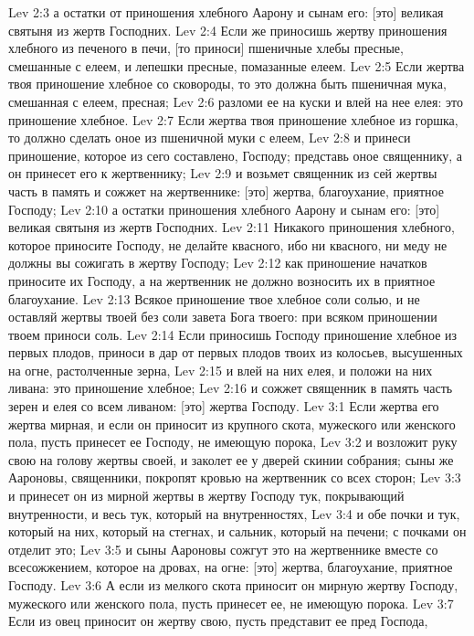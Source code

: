 Lev 2:3  а остатки от приношения хлебного Аарону и сынам его: [это] великая святыня из жертв Господних.
Lev 2:4  Если же приносишь жертву приношения хлебного из печеного в печи, [то приноси] пшеничные хлебы пресные, смешанные с елеем, и лепешки пресные, помазанные елеем.
Lev 2:5  Если жертва твоя приношение хлебное со сковороды, то это должна быть пшеничная мука, смешанная с елеем, пресная;
Lev 2:6  разломи ее на куски и влей на нее елея: это приношение хлебное.
Lev 2:7  Если жертва твоя приношение хлебное из горшка, то должно сделать оное из пшеничной муки с елеем,
Lev 2:8  и принеси приношение, которое из сего составлено, Господу; представь оное священнику, а он принесет его к жертвеннику;
Lev 2:9  и возьмет священник из сей жертвы часть в память и сожжет на жертвеннике: [это] жертва, благоухание, приятное Господу;
Lev 2:10  а остатки приношения хлебного Аарону и сынам его: [это] великая святыня из жертв Господних.
Lev 2:11  Никакого приношения хлебного, которое приносите Господу, не делайте квасного, ибо ни квасного, ни меду не должны вы сожигать в жертву Господу;
Lev 2:12  как приношение начатков приносите их Господу, а на жертвенник не должно возносить их в приятное благоухание.
Lev 2:13  Всякое приношение твое хлебное соли солью, и не оставляй жертвы твоей без соли завета Бога твоего: при всяком приношении твоем приноси соль.
Lev 2:14  Если приносишь Господу приношение хлебное из первых плодов, приноси в дар от первых плодов твоих из колосьев, высушенных на огне, растолченные зерна,
Lev 2:15  и влей на них елея, и положи на них ливана: это приношение хлебное;
Lev 2:16  и сожжет священник в память часть зерен и елея со всем ливаном: [это] жертва Господу.
Lev 3:1  Если жертва его жертва мирная, и если он приносит из крупного скота, мужеского или женского пола, пусть принесет ее Господу, не имеющую порока,
Lev 3:2  и возложит руку свою на голову жертвы своей, и заколет ее у дверей скинии собрания; сыны же Аароновы, священники, покропят кровью на жертвенник со всех сторон;
Lev 3:3  и принесет он из мирной жертвы в жертву Господу тук, покрывающий внутренности, и весь тук, который на внутренностях,
Lev 3:4  и обе почки и тук, который на них, который на стегнах, и сальник, который на печени; с почками он отделит это;
Lev 3:5  и сыны Аароновы сожгут это на жертвеннике вместе со всесожжением, которое на дровах, на огне: [это] жертва, благоухание, приятное Господу.
Lev 3:6  А если из мелкого скота приносит он мирную жертву Господу, мужеского или женского пола, пусть принесет ее, не имеющую порока.
Lev 3:7  Если из овец приносит он жертву свою, пусть представит ее пред Господа,
